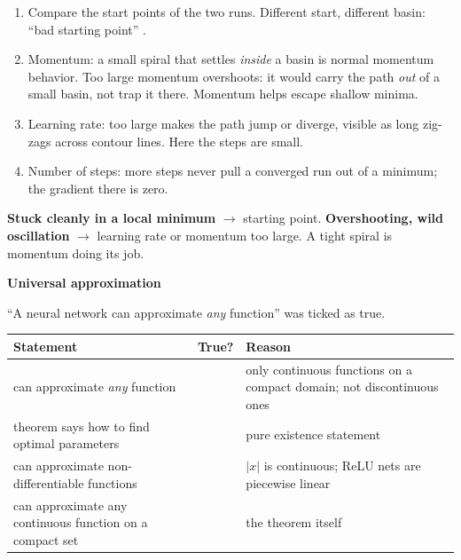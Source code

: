 \documentclass[11pt,a4paper]{article}
\newcommand{\ok}{\textcolor{rightc}{\ding{51}}}
\newcommand{\bad}{\textcolor{wrongc}{\ding{55}}}
\newcommand{\keep}[1]{\par
  \ifdim\dimexpr\pagegoal-\pagetotal\relax<#1\relax\newpage\fi}
\newcommand{\sub}[1]{\keep{6cm}\medskip
  {\sffamily\bfseries\large\color{accent}#1}\par\smallskip}
\begin{document}
\begin{steps}
\begin{enumerate}[leftmargin=*]
  \item Compare the start points of the two runs. Different start, different
        basin: ``bad starting point'' \ok.
  \item Momentum: a small spiral that settles \emph{inside} a basin is normal
        momentum behavior. Too large momentum overshoots: it would carry the
        path \emph{out} of a small basin, not trap it there. Momentum helps
        escape shallow minima. \bad
  \item Learning rate: too large makes the path jump or diverge, visible as
        long zig-zags across contour lines. Here the steps are small. \bad
  \item Number of steps: more steps never pull a converged run out of a
        minimum; the gradient there is zero. \bad
\end{enumerate}
\end{steps}

\begin{hook}
\textbf{Stuck cleanly in a local minimum} $\to$ starting point.
\textbf{Overshooting, wild oscillation} $\to$ learning rate or momentum too
large. A tight spiral is momentum doing its job.
\end{hook}

\sub{Universal approximation}

\begin{yours}
``A neural network can approximate \emph{any} function'' was ticked as true.
\end{yours}

\begin{center}\small
\begin{tabularx}{\linewidth}{@{}>{\raggedright\arraybackslash}p{5.6cm}c X@{}}
  \toprule
  Statement & True? & Reason \\
  \midrule
  can approximate \emph{any} function & \bad & only continuous functions on a
    compact domain; not discontinuous ones \\
  theorem says how to find optimal parameters & \bad & pure existence statement \\
  can approximate non-differentiable functions & \ok & $|x|$ is continuous; ReLU
    nets are piecewise linear \\
  can approximate any continuous function on a compact set & \ok & the theorem
    itself \\
  \bottomrule
\end{tabularx}
\end{center}
\end{document}
